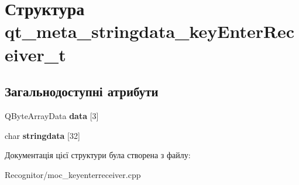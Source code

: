 \hypertarget{structqt__meta__stringdata__keyEnterReceiver__t}{\section{Структура qt\-\_\-meta\-\_\-stringdata\-\_\-key\-Enter\-Receiver\-\_\-t}
\label{structqt__meta__stringdata__keyEnterReceiver__t}
}
\subsection*{Загальнодоступні атрибути}
\begin{DoxyCompactItemize}
\item 
\hypertarget{structqt__meta__stringdata__keyEnterReceiver__t_a9e2ca77621768144ceb41c6d84f1f16a}{Q\-Byte\-Array\-Data {\bfseries data} \mbox{[}3\mbox{]}}\label{structqt__meta__stringdata__keyEnterReceiver__t_a9e2ca77621768144ceb41c6d84f1f16a}

\item 
\hypertarget{structqt__meta__stringdata__keyEnterReceiver__t_a4956864d5080e03e51b6d137cd787215}{char {\bfseries stringdata} \mbox{[}32\mbox{]}}\label{structqt__meta__stringdata__keyEnterReceiver__t_a4956864d5080e03e51b6d137cd787215}

\end{DoxyCompactItemize}


Документація цієї структури була створена з файлу\-:\begin{DoxyCompactItemize}
\item 
Recognitor/moc\-\_\-keyenterreceiver.\-cpp\end{DoxyCompactItemize}
